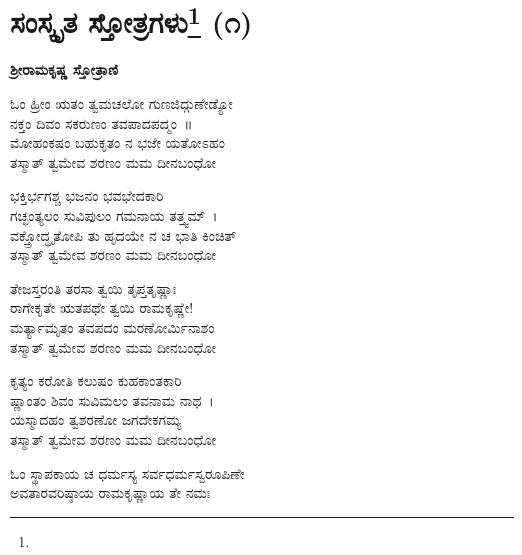 \selectkan

\insertlangkanintotoc

\chapter[ಸಂಸ್ಕೃತ ಸ್ತೋತ್ರಗಳು]{ಸಂಸ್ಕೃತ ಸ್ತೋತ್ರಗಳು\protect\footnote{} (೧)}

\begin{center}
\textbf{ಶ‍್ರೀರಾಮಕೃಷ್ಣ ಸ್ತೋತ್ರಾಣಿ}
\end{center}

\begin{myquote}
ಓಂ ಹ್ರೀಂ ಋತಂ ತ್ವಮಚಲೋ ಗುಣಜಿದ್ಗುಣೇಡ್ಯೋ\\ನಕ್ತಂ ದಿವಂ ಸಕರುಣಂ ತವಪಾದಪದ್ಮಂ~॥\\ಮೋಹಂಕಷಂ ಬಹುಕೃತಂ ನ ಭಜೇ ಯತೋಽಹಂ\\ತಸ್ಮಾತ್ ತ್ವಮೇವ ಶರಣಂ ಮಮ ದೀನಬಂಧೋ
\end{myquote}


\begin{myquote}
ಭಕ್ತಿರ್ಭಗಶ್ಚ ಭಜನಂ ಭವಭೇದಕಾರಿ\\ಗಚ್ಛಂತ್ಯಲಂ ಸುವಿಪುಲಂ ಗಮನಾಯ ತತ್ತ್ವಮ್~।\\ವಕ್ತ್ರೋದ್ಧೃತೋಪಿ ತು ಹೃದಯೇ ನ ಚ ಭಾತಿ ಕಿಂಚಿತ್\\ತಸ್ಮಾತ್ ತ್ವಮೇವ ಶರಣಂ ಮಮ ದೀನಬಂಧೋ
\end{myquote}


\begin{myquote}
ತೇಜಸ್ತರಂತಿ ತರಸಾ ತ್ವಯಿ ತೃಪ್ತತೃಷ್ಣಾಃ\\ರಾಗೇಕೃತೇ ಋತಪಥೇ ತ್ವಯಿ ರಾಮಕೃಷ್ಣೇ!\\ಮರ್ತ್ಯಾಮೃತಂ ತವಪದಂ ಮರಣೋರ್ಮಿನಾಶಂ\\ತಸ್ಮಾತ್ ತ್ವಮೇವ ಶರಣಂ ಮಮ ದೀನಬಂಧೋ
\end{myquote}


\begin{myquote}
ಕೃತ್ಯಂ ಕರೋತಿ ಕಲುಷಂ ಕುಹಕಾಂತಕಾರಿ\\ಷ್ಣಾಂತಂ ಶಿವಂ ಸುವಿಮಲಂ ತವನಾಮ ನಾಥ~।\\ಯಸ್ಮಾದಹಂ ತ್ವಶರಣೋ ಜಗದೇಕಗಮ್ಯ\\ತಸ್ಮಾತ್ ತ್ವಮೇವ ಶರಣಂ ಮಮ ದೀನಬಂಧೋ
\end{myquote}


\delimiter

\begin{myquote}
ಓಂ ಸ್ಥಾಪಕಾಯ ಚ ಧರ್ಮಸ್ಯ ಸರ್ವಧರ್ಮಸ್ವರೂಪಿಣೇ\\ಅವತಾರವರಿಷ್ಠಾಯ ರಾಮಕೃಷ್ಣಾಯ ತೇ ನಮಃ
\end{myquote}

